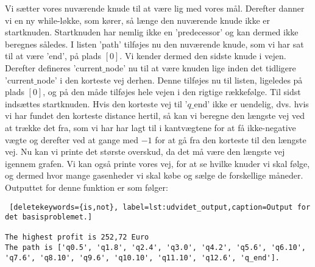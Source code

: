 Vi sætter vores nuværende knude til at være lig med vores mål.
Derefter danner vi en ny while-løkke, som kører, så længe den nuværende knude ikke er startknuden. Startknuden har nemlig ikke en 'predecessor' og kan dermed ikke beregnes således. I listen 'path' tilføjes nu den nuværende knude, som vi har sat til at være 'end', på plads $[0]$. Vi kender dermed den sidste knude i vejen. Derefter defineres 'current$\_$node' nu til at være knuden lige inden det tidligere 'current$\_$node' i den korteste vej derhen. Denne tilføjes nu til listen, ligeledes på plads $[0]$, og på den måde tilføjes hele vejen i den rigtige rækkefølge. Til sidst indsættes startknuden.
Hvis den korteste vej til '$q\_$end' ikke er uendelig, dvs. hvis vi har fundet den korteste distance hertil, så kan vi beregne den længste vej ved at trække det fra, som vi har har lagt til i kantvægtene for at få ikke-negative vægte og derefter ved at gange med $-1$ for at gå fra den korteste til den længste vej. 
Nu kan vi printe det største overskud, da det må være den længste vej igennem grafen. Vi kan også printe vores vej, for at se hvilke knuder vi skal følge, og dermed hvor mange gasenheder vi skal købe og sælge de forskellige måneder.
Outputtet for denne funktion er som følger:

\begin{lstlisting} [deletekeywords={is,not}, label=lst:udvidet_output,caption=Output for det basisproblemet.]

The highest profit is 252,72 Euro
The path is ['q0.5', 'q1.8', 'q2.4', 'q3.0', 'q4.2', 'q5.6', 'q6.10', 'q7.6', 'q8.10', 'q9.6', 'q10.10', 'q11.10', 'q12.6', 'q_end'].

\end{lstlisting}

